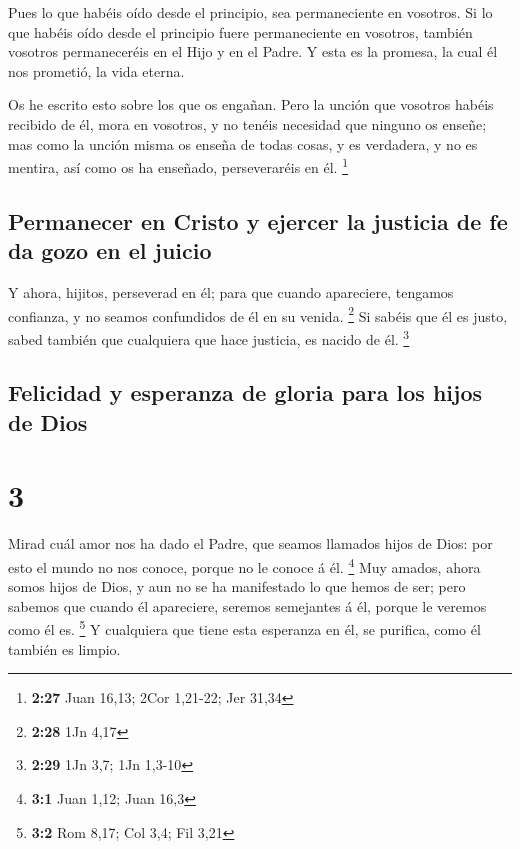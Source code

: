  Pues lo que habéis oído desde el principio, sea
permaneciente en vosotros. Si lo que habéis oído desde el principio
fuere permaneciente en vosotros, también vosotros permaneceréis en el
Hijo y en el Padre.  Y esta es la promesa, la cual él nos
prometió, la vida eterna.

 Os he escrito esto sobre los que os engañan. 
Pero la unción que vosotros habéis recibido de él, mora en vosotros, y
no tenéis necesidad que ninguno os enseñe; mas como la unción misma os
enseña de todas cosas, y es verdadera, y no es mentira, así como os ha
enseñado, perseveraréis en él. \footnote{\textbf{2:27} Juan 16,13; 2Cor
  1,21-22; Jer 31,34}

\hypertarget{permanecer-en-cristo-y-ejercer-la-justicia-de-fe-da-gozo-en-el-juicio}{%
\subsection{Permanecer en Cristo y ejercer la justicia de fe da gozo en
el
juicio}\label{permanecer-en-cristo-y-ejercer-la-justicia-de-fe-da-gozo-en-el-juicio}}

 Y ahora, hijitos, perseverad en él; para que cuando
apareciere, tengamos confianza, y no seamos confundidos de él en su
venida. \footnote{\textbf{2:28} 1Jn 4,17}  Si sabéis que él
es justo, sabed también que cualquiera que hace justicia, es nacido de
él. \footnote{\textbf{2:29} 1Jn 3,7; 1Jn 1,3-10}

\hypertarget{felicidad-y-esperanza-de-gloria-para-los-hijos-de-dios}{%
\subsection{Felicidad y esperanza de gloria para los hijos de
Dios}\label{felicidad-y-esperanza-de-gloria-para-los-hijos-de-dios}}

\hypertarget{section-2}{%
\section{3}\label{section-2}}

 Mirad cuál amor nos ha dado el Padre, que seamos llamados
hijos de Dios: por esto el mundo no nos conoce, porque no le conoce á
él. \footnote{\textbf{3:1} Juan 1,12; Juan 16,3}  Muy
amados, ahora somos hijos de Dios, y aun no se ha manifestado lo que
hemos de ser; pero sabemos que cuando él apareciere, seremos semejantes
á él, porque le veremos como él es. \footnote{\textbf{3:2} Rom 8,17; Col
  3,4; Fil 3,21}  Y cualquiera que tiene esta esperanza en
él, se purifica, como él también es limpio.

